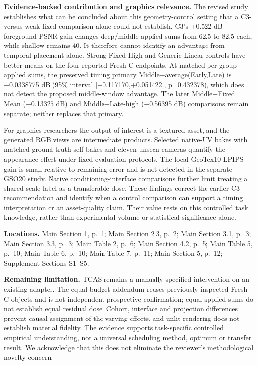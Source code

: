 \documentclass[
  10pt,
]{article}
\begin{document}
\textbf{Evidence-backed contribution and graphics relevance.} The
revised study establishes what can be concluded about this
geometry-control setting that a C3-versus-weak-fixed comparison alone
could not establish. C3's +0.522 dB foreground-PSNR gain changes
deep/middle applied sums from 62.5 to 82.5 each, while shallow remains
40. It therefore cannot identify an advantage from temporal placement
alone. Strong Fixed High and Generic Linear controls have better means
on the four reported Fresh C endpoints. At matched per-group applied
sums, the preserved timing primary Middle−average(Early,Late) is
−0.0338775 dB (95\% interval {[}−0.117170,+0.051422{]}, p=0.432378),
which does not detect the proposed middle-window advantage. The later
Middle−Fixed Mean (−0.13326 dB) and Middle−Late-high (−0.56395 dB)
comparisons remain separate; neither replaces that primary.

For graphics researchers the output of interest is a textured asset, and
the generated RGB views are intermediate products. Selected native-UV
bakes with matched ground-truth self-bakes and eleven unseen cameras
quantify the appearance effect under fixed evaluation protocols. The
local GeoTex10 LPIPS gain is small relative to remaining error and is
not detected in the separate GSO20 study. Native conditioning-interface
comparisons further limit treating a shared scale label as a
transferable dose. These findings correct the earlier C3 recommendation
and identify when a control comparison can support a timing
interpretation or an asset-quality claim. Their value rests on this
controlled task knowledge, rather than experimental volume or
statistical significance alone.

\textbf{Locations.} Main Section 1, p.~1; Main Section 2.3, p.~2; Main
Section 3.1, p.~3; Main Section 3.3, p.~3; Main Table 2, p.~6; Main
Section 4.2, p.~5; Main Table 5, p.~10; Main Table 6, p.~10; Main Table
7, p.~11; Main Section 5, p.~12; Supplement Sections S1--S5.

\textbf{Remaining limitation.} TCAS remains a manually specified
intervention on an existing adapter. The equal-budget addendum reuses
previously inspected Fresh C objects and is not independent prospective
confirmation; equal applied sums do not establish equal residual dose.
Cohort, interface and projection differences prevent causal assignment
of the varying effects, and unlit rendering does not establish material
fidelity. The evidence supports task-specific controlled empirical
understanding, not a universal scheduling method, optimum or transfer
result. We acknowledge that this does not eliminate the reviewer's
methodological novelty concern.
\end{document}
